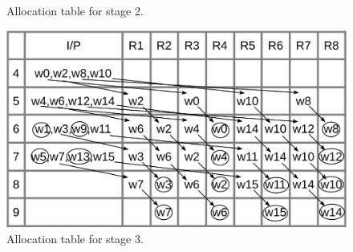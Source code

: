 \begin{frame}
\begin{columns}[t,onlytextwidth]
\begin{column}{0.45\linewidth}
\begin{figure}[h!]
	    		\caption{\footnotesize Allocation table for stage 2.}
	    	\end{figure}
	    	\vspace{-0.75cm}
	    	\begin{figure}[h!] \centering
	    		\includegraphics[height=0.30\paperheight]{./image/tab-life-c.png}
	    		\caption{\footnotesize Allocation table for stage 3.}
	    	\end{figure}  
   		\end{column}
	\end{columns}
\end{frame}

